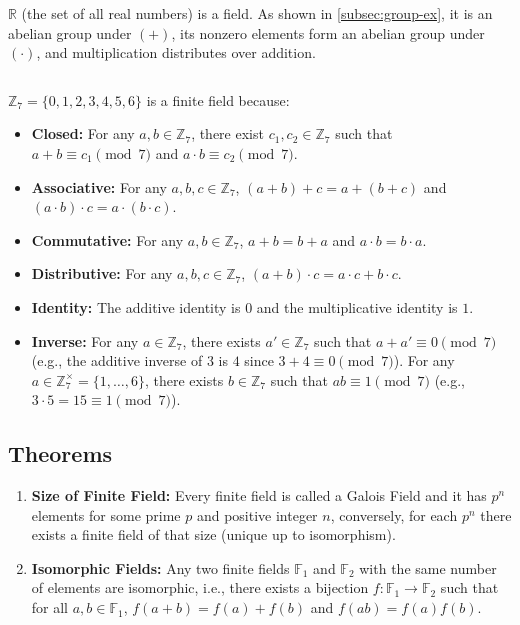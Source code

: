 \noindent $\mathbb{R}$ (the set of all real numbers) is a field. As shown in \autoref{subsec:group-ex}, it is an abelian group under $(+)$, its nonzero elements form an abelian group under $(\cdot)$, and multiplication distributes over addition.

$ $

\noindent $\mathbb{Z}_7 = \{0, 1, 2, 3, 4, 5, 6\}$ is a finite field because:
\begin{itemize}
\item \textbf{Closed:} For any $a,b \in \mathbb{Z}_7$, there exist $c_1,c_2 \in \mathbb{Z}_7$ such that $a+b \equiv c_1 \pmod{7}$ and $a\cdot b \equiv c_2 \pmod{7}$.
\item \textbf{Associative:} For any $a,b,c \in \mathbb{Z}_7$, $(a+b)+c=a+(b+c)$ and $(a\cdot b)\cdot c=a\cdot(b\cdot c)$.
\item \textbf{Commutative:} For any $a,b \in \mathbb{Z}_7$, $a+b=b+a$ and $a\cdot b=b\cdot a$.
\item \textbf{Distributive:} For any $a,b,c \in \mathbb{Z}_7$, $(a+b)\cdot c=a\cdot c+b\cdot c$.
\item \textbf{Identity:} The additive identity is $0$ and the multiplicative identity is $1$.
\item \textbf{Inverse:} For any $a \in \mathbb{Z}_7$, there exists $a' \in \mathbb{Z}_7$ such that $a+a' \equiv 0 \pmod{7}$ (e.g., the additive inverse of $3$ is $4$ since $3+4\equiv0 \pmod{7}$). For any $a \in \mathbb{Z}_7^\times=\{1,\dots,6\}$, there exists $b \in \mathbb{Z}_7$ such that $ab \equiv 1 \pmod{7}$ (e.g., $3\cdot5=15\equiv1 \pmod{7}$).
\end{itemize}

\subsection{Theorems}
\label{subsec:field-theorem}

\begin{tcolorbox}[title={\textbf{\tboxtheorem{\ref*{subsec:field-theorem}} Field Theorems}}]
\begin{enumerate}
\item \textbf{Size of Finite Field:} Every finite field is called a Galois Field and it has $p^n$ elements for some prime $p$ and positive integer $n$, conversely, for each $p^n$ there exists a finite field of that size (unique up to isomorphism).
\item \textbf{Isomorphic Fields:} Any two finite fields $\mathbb{F}_1$ and $\mathbb{F}_2$ with the same number of elements are isomorphic, i.e., there exists a bijection $f:\mathbb{F}_1\to\mathbb{F}_2$ such that for all $a,b\in\mathbb{F}_1$, $f(a+b)=f(a)+f(b)$ and $f(ab)=f(a)f(b)$.
\end{enumerate}
\end{tcolorbox}
